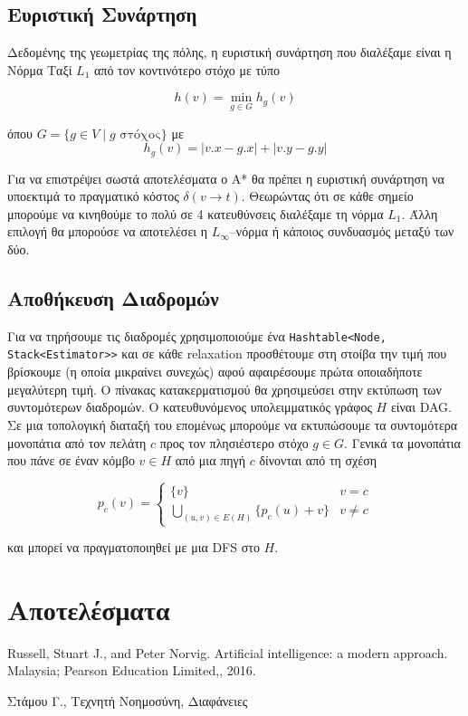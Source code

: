 \documentclass[a4paper,oneside,12pt]{article}
\begin{document}
\subsection{Ευριστική Συνάρτηση}

Δεδομένης της γεωμετρίας της πόλης, η ευριστική συνάρτηση που διαλέξαμε είναι η Νόρμα Ταξί $L_1$ από τον κοντινότερο στόχο με τύπο 

$$h(v) = \min_{g \in G} h_g(v)$$

όπου $G = \{ g \in V \mid g \text{ στόχος} \}$ με $$h_g(v) = | v.x - g.x | + |v.y - g.y |$$
 
Για να επιστρέψει σωστά αποτελέσματα ο Α* θα πρέπει η ευριστική συνάρτηση να υποεκτιμά το πραγματικό κόστος $\delta (v \to t)$. Θεωρώντας ότι σε κάθε σημείο μπορούμε να κινηθούμε το πολύ σε 4 κατευθύνσεις διαλέξαμε τη νόρμα $L_1$. Άλλη επιλογή θα μπορούσε να αποτελέσει η $L_\infty$--νόρμα ή κάποιος συνδυασμός μεταξύ των δύο.  

\subsection{Αποθήκευση Διαδρομών} 

Για να τηρήσουμε τις διαδρομές χρησιμοποιούμε ένα \texttt{Hashtable<Node, Stack<Estimator>>} και σε κάθε relaxation προσθέτουμε στη στοίβα την τιμή που βρίσκουμε (η οποία μικραίνει συνεχώς) αφού αφαιρέσουμε πρώτα οποιαδήποτε μεγαλύτερη τιμή. Ο πίνακας κατακερματισμού θα χρησιμεύσει στην εκτύπωση των συντομότερων διαδρομών. Ο κατευθυνόμενος υπολειμματικός γράφος $H$ είναι DAG. Σε μια τοπολογική διαταξή του επομένως μπορούμε να εκτυπώσουμε τα συντομότερα μονοπάτια από τον πελάτη $c$ προς τον πλησιέστερο στόχο $g \in G$. Γενικά τα μονοπάτια που πάνε σε έναν κόμβο $v \in H$ από μια πηγή $c$ δίνονται από τη σχέση

$$p_c(v) = 
\begin{cases}
\{v\} & v = c \\
\bigcup_{(u, v) \in E(H)} \{ p_c(u) + v \}   & v \neq c
 
\end{cases}
$$

και μπορεί να πραγματοποιηθεί με μια DFS στο $H$. 
 
\section{Αποτελέσματα}





\begin{thebibliography}{9}

 Russell, Stuart J., and Peter Norvig. Artificial intelligence: a modern approach. Malaysia; Pearson Education Limited,, 2016.

 Στάμου Γ., Τεχνητή Νοημοσύνη, Διαφάνειες

\end{thebibliography}
\end{document}
